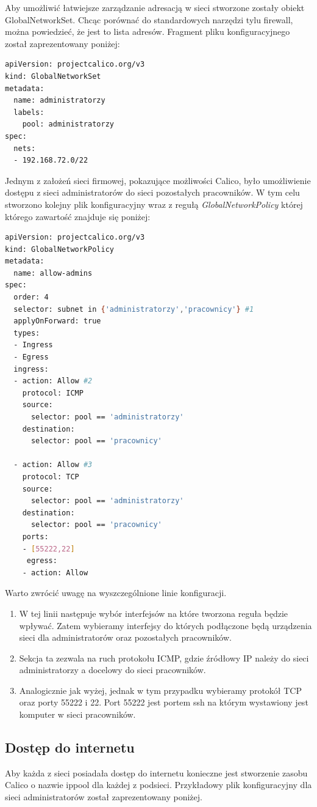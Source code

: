 \documentclass[pl,final,oneside]{mgr} %
\begin{document}
Aby umożliwić łatwiejsze zarządzanie adresacją w sieci stworzone zostały obiekt GlobalNetworkSet. Chcąc porównać do standardowych narzędzi tylu firewall, można powiedzieć, że jest to lista adresów. Fragment pliku konfiguracyjnego został zaprezentowany poniżej:

\begin{lstlisting}[language=Bash]
apiVersion: projectcalico.org/v3
kind: GlobalNetworkSet
metadata:
  name: administratorzy
  labels:
    pool: administratorzy
spec:
  nets:
  - 192.168.72.0/22
\end{lstlisting}

Jednym z założeń sieci firmowej, pokazujące możliwości Calico, było umożliwienie dostępu z sieci administratorów do sieci pozostałych pracowników. W tym celu stworzono kolejny plik konfiguracyjny wraz z regułą \textit{GlobalNetworkPolicy} której którego zawartość znajduje się poniżej:

\begin{lstlisting}[language=Bash]
apiVersion: projectcalico.org/v3
kind: GlobalNetworkPolicy
metadata:
  name: allow-admins
spec:
  order: 4
  selector: subnet in {'administratorzy','pracownicy'} #1
  applyOnForward: true
  types:
  - Ingress
  - Egress
  ingress:
  - action: Allow #2
    protocol: ICMP
    source:
      selector: pool == 'administratorzy'
    destination:
      selector: pool == 'pracownicy'

  - action: Allow #3
    protocol: TCP
    source:
      selector: pool == 'administratorzy'
    destination:
      selector: pool == 'pracownicy'
    ports:
    - [55222,22]    
     egress:
    - action: Allow
\end{lstlisting}
Warto zwrócić uwagę na wyszczególnione linie konfiguracji.
\begin{enumerate}
	\item W tej linii następuje wybór interfejsów na które tworzona reguła będzie wpływać. Zatem wybieramy interfejsy do których podłączone będą urządzenia sieci dla administratorów oraz pozostałych pracowników.
	\item Sekcja ta zezwala na ruch protokołu ICMP, gdzie źródłowy IP należy do sieci administratorzy a docelowy do sieci pracowników.
	\item Analogicznie jak wyżej, jednak w tym przypadku wybieramy protokół TCP oraz porty 55222 i 22. Port 55222 jest portem ssh na którym wystawiony jest komputer w sieci pracowników.
\end{enumerate}

\subsection{Dostęp do internetu}
Aby każda z sieci posiadała dostęp do internetu konieczne jest stworzenie zasobu Calico o nazwie ippool dla każdej z podsieci. Przykładowy plik konfiguracyjny dla sieci administratorów został zaprezentowany poniżej. 
\end{document}
